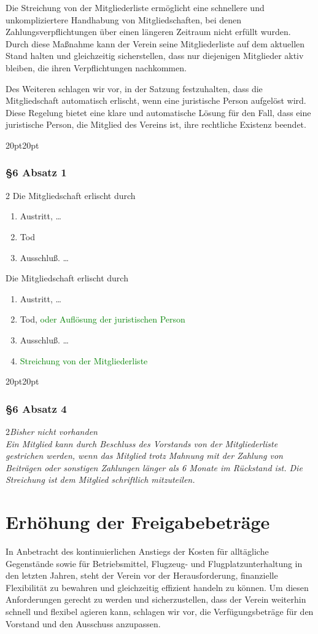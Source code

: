 \documentclass[10pt,a4paper,parskip=half]{scrartcl}
\newcommand{\new}[1]{\textcolor{Green}{#1}}
\newcommand{\change}[1]{
  \begin{adjustwidth}{20pt}{20pt}
    #1
  \end{adjustwidth}
}
\newcommand{\compare}[3]{\change{\subsubsection*{#1}\begin{multicols}{2}#2\columnbreak\\#3\end{multicols}}}
\begin{document}
Die Streichung von der Mitgliederliste ermöglicht eine schnellere und unkompliziertere Handhabung von Mitgliedschaften, bei denen Zahlungsverpflichtungen über einen längeren Zeitraum nicht erfüllt wurden. Durch diese Maßnahme kann der Verein seine Mitgliederliste auf dem aktuellen Stand halten und gleichzeitig sicherstellen, dass nur diejenigen Mitglieder aktiv bleiben, die ihren Verpflichtungen nachkommen.

Des Weiteren schlagen wir vor, in der Satzung festzuhalten, dass die Mitgliedschaft automatisch erlischt, wenn eine juristische Person aufgelöst wird. Diese Regelung bietet eine klare und automatische Lösung für den Fall, dass eine juristische Person, die Mitglied des Vereins ist, ihre rechtliche Existenz beendet.

\change{
  \subsubsection*{§6 Absatz 1}
  \begin{multicols}{2}
    Die Mitgliedschaft erlischt durch
    \begin{enumerate}[label=\alph*)]
      \item Austritt, \dots
      \item Tod
      \item{Ausschluß.} \dots
    \end{enumerate}
    \columnbreak
    Die Mitgliedschaft erlischt durch
    \begin{enumerate}[label=\alph*)]
      \item Austritt, \dots
      \item Tod, \new{oder Auflösung der juristischen Person}
      \item{Ausschluß.} \dots
      \item \new{Streichung von der Mitgliederliste}
    \end{enumerate}
  \end{multicols}
}
\compare{§6 Absatz 4}{\em Bisher nicht vorhanden \em}{Ein Mitglied kann durch Beschluss des Vorstands von der Mitgliederliste gestrichen werden,
  wenn das Mitglied trotz Mahnung mit der Zahlung von Beiträgen oder sonstigen Zahlungen länger als 6 Monate im Rückstand ist.
  Die Streichung ist dem Mitglied schriftlich mitzuteilen.}

\clearpage
\section{Erhöhung der Freigabebeträge}
In Anbetracht des kontinuierlichen Anstiegs der Kosten für alltägliche Gegenstände sowie für Betriebsmittel, Flugzeug- und Flugplatzunterhaltung in den letzten Jahren, steht der Verein vor der Herausforderung, finanzielle Flexibilität zu bewahren und gleichzeitig effizient handeln zu können. Um diesen Anforderungen gerecht zu werden und sicherzustellen, dass der Verein weiterhin schnell und flexibel agieren kann, schlagen wir vor, die Verfügungsbeträge für den Vorstand und den Ausschuss anzupassen.
\end{document}
